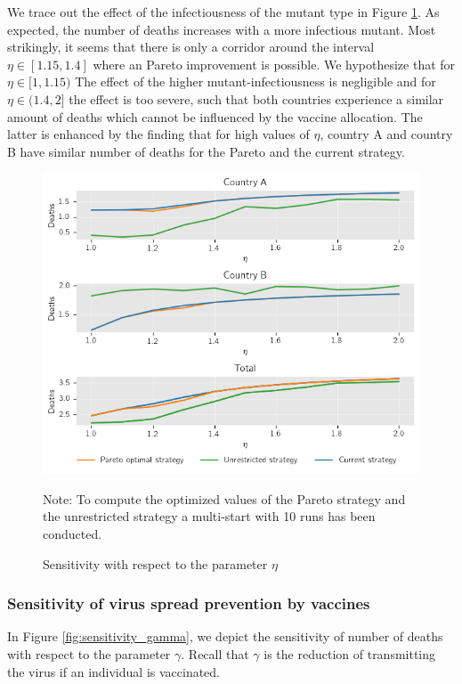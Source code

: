 We trace out the effect of the infectiousness of the mutant type in Figure \ref{fig:sensitivity_eta}. As expected, the number of deaths increases with a more infectious mutant. Most strikingly, it seems that there is only a corridor around the interval $\eta \in [1.15, 1.4]$ where an Pareto improvement is possible. We hypothesize that for $\eta \in [1, 1.15)$ The effect of the higher mutant-infectiousness is negligible and for $\eta \in (1.4, 2]$ the effect is too severe, such that both countries experience a similar amount of deaths which cannot be influenced by the vaccine allocation. The latter is enhanced by the finding that for high values of $\eta$, country A and country B have similar number of deaths for the Pareto and the current strategy.
\begin{figure}[h!]
\centering
\includegraphics[scale=0.59]{images/sensitivity_eta.png}
\begin{flushleft}
\scriptsize{Note:} To compute the optimized values of the Pareto strategy and the unrestricted strategy a multi-start with 10 runs has been conducted.
\end{flushleft}
\caption{Sensitivity with respect to the parameter $\eta$}
\label{fig:sensitivity_eta}
\end{figure}



\subsubsection{Sensitivity of virus spread prevention by vaccines}
\label{A:gamma}
In Figure \ref{fig:sensitivity_gamma}, we depict the sensitivity of number of deaths with respect to the parameter $\gamma$. Recall that $\gamma$ is the reduction of transmitting the virus if an individual is vaccinated. 

